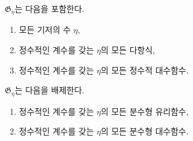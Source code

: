 
$\mathfrak G_\eta$는 다음을 포함한다.
\begin{enumerate}
\item[1)] 모든 기저의 수 $\eta$,
\item[2)] 정수적인 계수를 갖는 $\eta$의 모든 다항식,
\item[3)] 정수적인 계수를 갖는 $\eta$의 모든 정수적 대수함수.
\end{enumerate}
$\mathfrak G_\eta$는 다음을 배제한다.
\begin{enumerate}
\item[4)] 정수적인 계수를 갖는 $\eta$의 모든 분수형 유리함수,
\item[5)] 정수적인 계수를 갖는 $\eta$의 모든 분수형 대수함수.
\end{enumerate}
